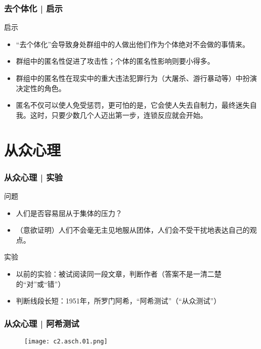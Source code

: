 \begin{frame}
  \frametitle{去个体化 | \alert{启示}}
  \begin{block}{启示}
    \begin{itemize}
      \item “去个体化”会导致身处群组中的人做出他们作为个体绝对不会做的事情来。
      \item 群组中的匿名性促进了攻击性；个体的匿名性影响则要小得多。
      \item 群组中的匿名性在现实中的重大违法犯罪行为（大屠杀、游行暴动等）中扮演决定性的角色。
      \item 匿名不仅可以使人免受惩罚，更可怕的是，它会使人失去自制力，最终迷失自我。这时，只要少数几个人迈出第一步，连锁反应就会开始。
    \end{itemize}
  \end{block}
\end{frame}

\section{从众心理}
\begin{frame}
  \frametitle{从众心理 | 实验}
  \begin{block}{问题}
    \begin{itemize}
      \item 人们是否容易屈从于集体的压力？
      \item （意欲证明）人们不会毫无主见地服从团体，人们会不受干扰地表达自己的观点。
    \end{itemize}
  \end{block}
  \pause
  \begin{block}{实验}
    \begin{itemize}
      \item 以前的实验：被试阅读同一段文章，判断作者（答案不是一清二楚的“对”或“错”）
      \item 判断线段长短：1951年，所罗门\textbullet 阿希，“阿希测试”（“从众测试”）
    \end{itemize}
  \end{block}
\end{frame}

\begin{frame}
  \frametitle{从众心理 | 阿希测试}
  \begin{figure}
    \centering
    \texttt{[image: c2.asch.01.png]}
  \end{figure}
\end{frame}

